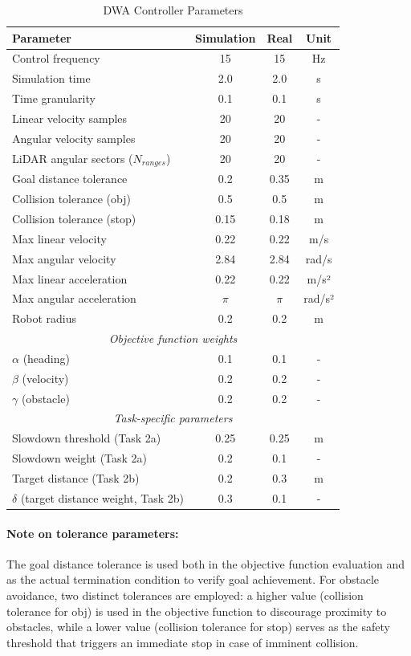 \begin{table}[h]
\centering
\caption{DWA Controller Parameters}
\label{tab:dwa_params}
\begin{tabular}{lccc}
\hline
\textbf{Parameter} & \textbf{Simulation} & \textbf{Real} & \textbf{Unit} \\
\hline
Control frequency & 15 & 15 & Hz \\
Simulation time& 2.0 & 2.0 & s \\
Time granularity & 0.1 & 0.1 & s \\
Linear velocity samples & 20 & 20 & - \\
Angular velocity samples & 20 & 20 & - \\
LiDAR angular sectors ($N_{ranges}$) & 20 & 20 & - \\
Goal distance tolerance & 0.2 & 0.35 & m \\
Collision tolerance (obj) & 0.5 & 0.5 & m \\
Collision tolerance (stop) & 0.15 & 0.18 & m \\
Max linear velocity & 0.22 & 0.22 & m/s \\
Max angular velocity & 2.84 & 2.84 & rad/s \\
Max linear acceleration & 0.22 & 0.22 & m/s² \\
Max angular acceleration & $\pi$ & $\pi$ & rad/s² \\
Robot radius & 0.2 & 0.2 & m \\
\hline
\multicolumn{4}{c}{\textit{Objective function weights}} \\
\hline
$\alpha$ (heading) & 0.1 & 0.1 & - \\
$\beta$ (velocity) & 0.2 & 0.2 & - \\
$\gamma$ (obstacle) & 0.2 & 0.2 & - \\
\hline
\multicolumn{4}{c}{\textit{Task-specific parameters}} \\
\hline
Slowdown threshold (Task 2a) & 0.25 & 0.25 & m \\
Slowdown weight (Task 2a) & 0.2 & 0.1 & - \\
Target distance (Task 2b) & 0.2 & 0.3 & m \\
$\delta$ (target distance weight, Task 2b) & 0.3 & 0.1 & - \\
\hline
\end{tabular}
\end{table}


\paragraph{Note on tolerance parameters:} The goal distance tolerance is used both in the objective function evaluation and as the actual termination condition to verify goal achievement. For obstacle avoidance, two distinct tolerances are employed: a higher value (collision tolerance for obj) is used in the objective function to discourage proximity to obstacles, while a lower value (collision tolerance for stop) serves as the safety threshold that triggers an immediate stop in case of imminent collision.
